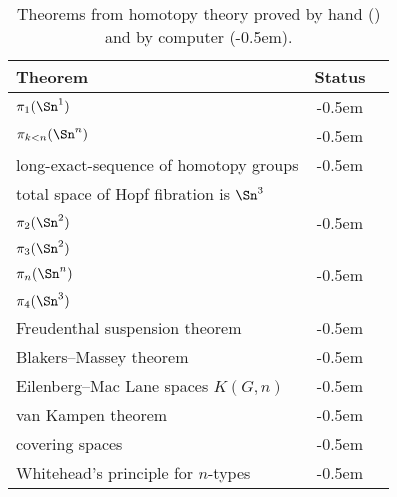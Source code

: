 {{
\newcommand{\humancheck}{\ding{52}}
\newcommand{\computercheck}{\ding{52}\kern-0.5em\ding{52}}
\begin{table}[htb]
  \centering
\begin{tabular}{lcc}
\toprule
Theorem         & Status \\
\midrule
$\pi_1(\Sn ^1)$                     & \computercheck \\
$\pi_{k<n}(\Sn ^n)$                  & \computercheck \\
long-exact-sequence of homotopy groups & \computercheck    \\
total space of Hopf fibration is $\Sn ^3$ & \humancheck    \\
$\pi_2(\Sn ^2)$                     & \computercheck \\
$\pi_3(\Sn ^2)$                     & \humancheck    \\
$\pi_n(\Sn ^n)$                     & \computercheck \\
$\pi_4(\Sn ^3)$                     & \humancheck    \\
Freudenthal suspension theorem      & \computercheck \\
Blakers--Massey theorem              & \computercheck \\
Eilenberg--Mac Lane spaces $K(G,n)$ & \computercheck \\
van Kampen theorem                & \computercheck \\
covering spaces                     & \computercheck \\
Whitehead's principle for $n$-types & \computercheck \\
\bottomrule
\end{tabular}
\caption{Theorems from homotopy theory proved by
  hand (\humancheck) and by computer (\computercheck).}
  \label{tab:theorems}
\end{table}
}

}

